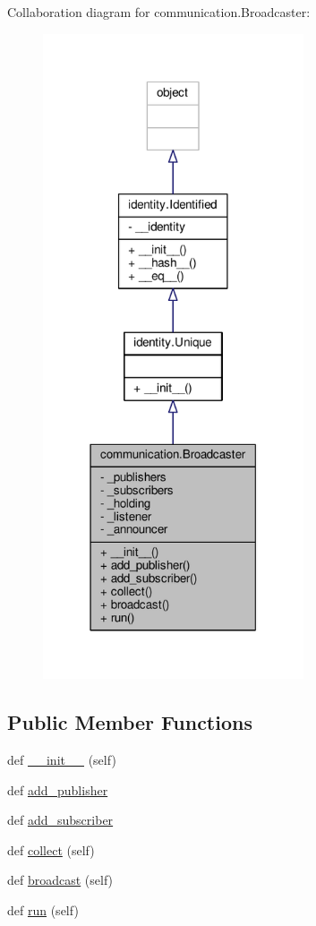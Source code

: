 Collaboration diagram for communication.\+Broadcaster\+:\nopagebreak
\begin{figure}[H]
\begin{center}
\leavevmode
\includegraphics[width=218pt]{classcommunication_1_1Broadcaster__coll__graph}
\end{center}
\end{figure}
\subsection*{Public Member Functions}
\begin{DoxyCompactItemize}
\item 
def \hyperlink{classcommunication_1_1Broadcaster_a81e4586e9514ea1a09f5c1ddee5b597b}{\+\_\+\+\_\+init\+\_\+\+\_\+} (self)
\item 
def \hyperlink{classcommunication_1_1Broadcaster_a67aab0280a7e13350f270c78e4a42194}{add\+\_\+publisher}
\item 
def \hyperlink{classcommunication_1_1Broadcaster_aa49f0a6045070247bad9757890b90cac}{add\+\_\+subscriber}
\item 
def \hyperlink{classcommunication_1_1Broadcaster_ae300314c75928ccb07e1ae4364f21f64}{collect} (self)
\item 
def \hyperlink{classcommunication_1_1Broadcaster_a2c05745ab1871beae38ab73567422dba}{broadcast} (self)
\item 
def \hyperlink{classcommunication_1_1Broadcaster_a5eff36c2fc55f7e451f73499eba5c4dc}{run} (self)
\end{DoxyCompactItemize}
